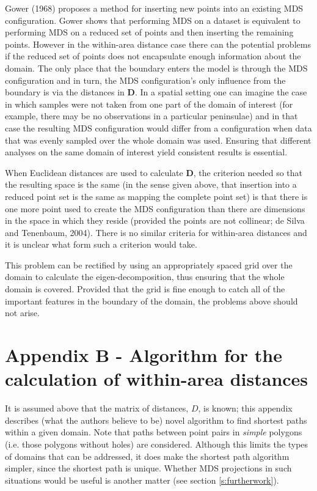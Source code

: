 \documentclass[useAMS, referee]{biom}
\begin{document}
Gower (1968) proposes a method for inserting new points into an existing MDS configuration. Gower shows that performing MDS on a dataset is equivalent to performing MDS on a reduced set of points and then inserting the remaining points. However in the within-area distance case there can the potential problems if the reduced set of points does not encapsulate enough information about the domain. The only place that the boundary enters the model is through the MDS configuration and in turn, the MDS configuration's only influence from the boundary is via the distances in $\mathbf{D}$. In a spatial setting one can imagine the case in which samples were not taken from one part of the domain of interest (for example, there may be no observations in a particular peninsulae) and in that case the resulting MDS configuration would differ from a configuration when data that was evenly sampled over the whole domain was used. Ensuring that different analyses on the same domain of interest yield consistent results is essential.

When Euclidean distances are used to calculate $\mathbf{D}$, the criterion needed so that the resulting space is the same (in the sense given above, that insertion into a reduced point set is the same as mapping the complete point set) is that there is one more point used to create the MDS configuration than there are dimensions in the space in which they reside (provided the points are not collinear; de Silva and Tenenbaum, 2004). There is no similar criteria for within-area distances and it is unclear what form such a criterion would take.

This problem can be rectified by using an appropriately spaced grid over the domain to calculate the eigen-decomposition, thus ensuring that the whole domain is covered. Provided that the grid is fine enough to catch all of the important features in the boundary of the domain, the problems above should not arise.

\section*{Appendix B - Algorithm for the calculation of within-area distances}

It is assumed above that the matrix of distances, $D$, is known; this appendix describes (what the authors believe to be) novel algorithm to find shortest paths within a given domain. Note that paths between point pairs in \textit{simple} polygons (i.e. those polygons without holes) are considered. Although this limits the types of domains that can be addressed, it does make the shortest path algorithm simpler, since the shortest path is unique. Whether MDS projections in such situations would be useful is another matter (see section \ref{s:furtherwork}).
\end{document}

